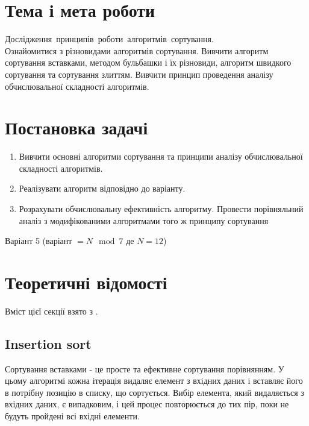 \nocite{*}
\sffamily

\section{Тема і мета роботи}
 Дослідження принципів роботи алгоритмів сортування.\\
 Ознайомитися з різновидами алгоритмів сортування. Вивчити
алгоритм сортування вставками, методом бульбашки і їх різновиди, алгоритм
швидкого сортування та сортування злиттям. Вивчити принцип проведення
аналізу обчислювальної складності алгоритмів.

\section{Постановка задачі}
\begin{enumerate}
	\item Вивчити основні алгоритми сортування та принципи аналізу
обчислювальної складності алгоритмів.
	\item Реалізувати алгоритм відповідно до варіанту.
	\item Розрахувати обчислювальну ефективність алгоритму. Провести
порівняльний аналіз з модифікованими алгоритмами того ж принципу
сортування
\end{enumerate}
Варіант 5 (варіант \(=N\mod7\) де \(N=12\))

\section{Теоретичні відомості}
Вміст цієї секції взято з \cite{Karumanchi_2020}.
\subsection{Insertion sort}
Сортування вставками - це просте та ефективне сортування порівнянням. У цьому алгоритмі кожна ітерація видаляє елемент з вхідних даних і вставляє його в потрібну позицію в списку, що сортується. Вибір елемента, який видаляється з вхідних даних, є випадковим, і цей процес повторюється до тих пір, поки не будуть пройдені всі вхідні елементи.
